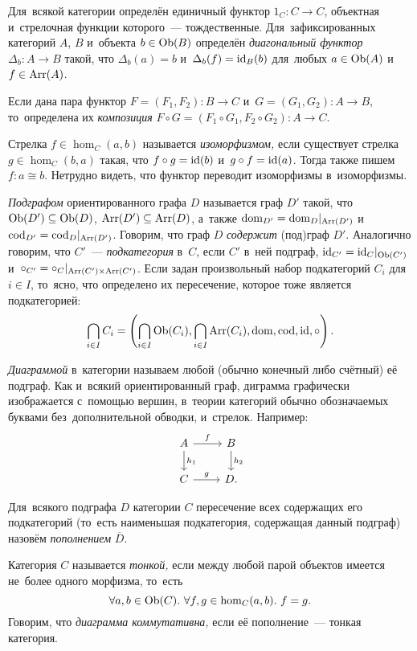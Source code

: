 \documentclass[a4paper,oneside]{article}
\begin{document}
Для~всякой категории определён единичный функтор $1_C : C \rightarrow C$, объектная и~стрелочная функции которого~— тождественные.
Для~зафиксированных категорий $A$, $B$ и~объекта $b \in \mathrm{Ob}(B)$ определён \textit{диагональный функтор} $\Delta_b : A \rightarrow B$
такой, что $\Delta_b(a) = b$ и~$\Delta_b(f) = \mathrm{id}_B(b)$ для~любых $a \in \mathrm{Ob}(A)$ и~$f \in \mathrm{Arr}(A)$.

Если дана пара функтор $F = (F_1, F_2) : B \rightarrow C$ и~$G = (G_1, G_2) : A \rightarrow B$,
то~определена их \textit{композиция} $F \circ G = (F_1 \circ G_1, F_2 \circ G_2) : A \rightarrow C$.

Стрелка $f \in \hom_C(a, b)$ называется \textit{изоморфизмом,} если существует стрелка $g \in \hom_C(b, a)$
такая, что $f \circ g = \mathrm{id}(b)$ и~$g \circ f = \mathrm{id}(a)$. Тогда также пишем $f : a \cong b$.
Нетрудно видеть, что функтор переводит изоморфизмы в~изоморфизмы.

\textit{Подграфом} ориентированного графа $D$ называется граф $D'$ такой, что $\mathrm{Ob}(D') \subseteq \mathrm{Ob}(D)$, $\mathrm{Arr}(D') \subseteq \mathrm{Arr}(D)$,
а~также $\mathrm{dom}_{D'} = \mathrm{dom}_{D} |_{\mathrm{Arr}(D')}$ и~$\mathrm{cod}_{D'} = \mathrm{cod}_{D} |_{\mathrm{Arr}(D')}$.
Говорим, что граф $D$ \textit{содержит} (под)граф $D'$.
Аналогично говорим, что $C'$~— \textit{подкатегория} в~$C$, если $C'$ в~ней подграф, $\mathrm{id}_{C'} = \mathrm{id}_{C} |_{\mathrm{Ob}(C')}$
и~$\circ_{C'} = \circ_{C} |_{\mathrm{Arr}(C') \times \mathrm{Arr}(C')}$.
Если задан произвольный набор подкатегорий $C_i$ для~$i \in I$, то~ясно, что определено их пересечение, которое тоже является подкатегорией:
\[
  \bigcap\limits_{i \in I} C_i = \left( \bigcap\limits_{i \in I} \mathrm{Ob}(C_i), \bigcap\limits_{i \in I} \mathrm{Arr}(C_i), \mathrm{dom}, \mathrm{cod}, \mathrm{id}, \circ \right).
\]

\textit{Диаграммой} в~категории называем любой (обычно конечный либо счётный) её подграф.
Как и~всякий ориентированный граф, диграмма графически изображается с~помощью вершин,
в~теории категорий обычно обозначаемых буквами без~дополнительной обводки, и~стрелок.
Например:
\[
  \begin{tikzcd}
    \arrow{d}{h_1} A \arrow{r}{f} & B \arrow{d}{h_2} \\
                   C \arrow{r}{g} & D.
  \end{tikzcd}
\]

Для~всякого подграфа $D$ категории $C$ пересечение всех содержащих его подкатегорий
(то~есть наименьшая подкатегория, содержащая данный подграф) назовём \textit{пополнением} $\overline{D}$.

Категория $C$ называется \textit{тонкой,} если между любой парой объектов имеется не~более одного морфизма,
то~есть \[ \forall a, b \in \mathrm{Ob}(C).\ \forall f, g \in \hom_C(a, b).\ f = g. \]
Говорим, что \textit{диаграмма коммутативна,} если её пополнение~— тонкая категория.
\end{document}
